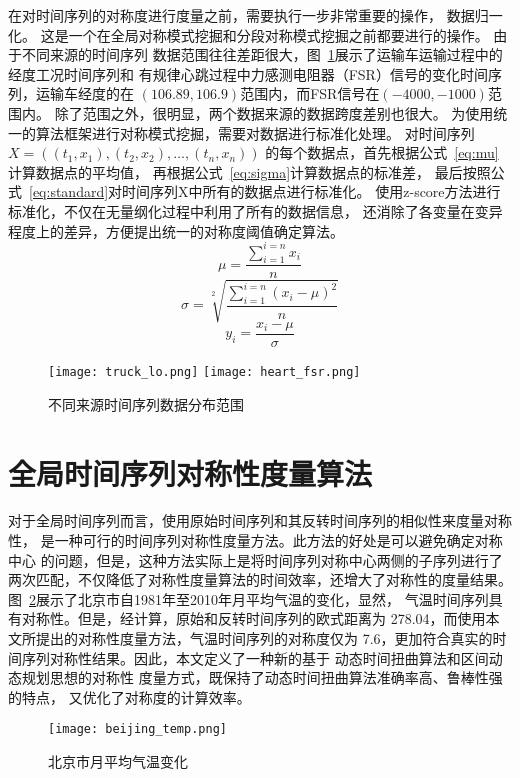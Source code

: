 在对时间序列的对称度进行度量之前，需要执行一步非常重要的操作，
数据归一化\cite{DBLP:journals/tec/HeITWNS21}。
这是一个在全局对称模式挖掘和分段对称模式挖掘之前都要进行的操作。
由于不同来源的时间序列
数据范围往往差距很大，图~\ref{fig:data_range}展示了运输车运输过程中的经度工况时间序列和
有规律心跳过程中力感测电阻器（FSR）信号的变化时间序列，运输车经度的在
$(106.89,106.9)$范围内，而FSR信号在$(-4000,-1000)$范围内。
除了范围之外，很明显，两个数据来源的数据跨度差别也很大。
为使用统一的算法框架进行对称模式挖掘，需要对数据进行标准化处理。
对时间序列$X=\left(\left(t_{1}, x_{1}\right),\left(t_{2}, x_{2}\right), \ldots,\left(t_{n}, x_{n}\right)\right)$
的每个数据点，首先根据公式~\ref{eq:mu}计算数据点的平均值，
再根据公式~\ref{eq:sigma}计算数据点的标准差，
最后按照公式~\ref{eq:standard}对时间序列X中所有的数据点进行标准化。
使用z-score方法进行标准化，不仅在无量纲化过程中利用了所有的数据信息，
还消除了各变量在变异程度上的差异，方便提出统一的对称度阈值确定算法。
\begin{equation}
  \mu=\frac{\sum_{i=1}^{i=n} x_{i}}{n}
  \label{eq:mu}
\end{equation}
\begin{equation}
  \sigma=\sqrt[2]{\frac{\sum_{i=1}^{i=n}\left(x_{i}-\mu\right)^{2}}{n}}
  \label{eq:sigma}
\end{equation}
\begin{equation}
  y_{i}=\frac{x_{i}-\mu}{\sigma}
  \label{eq:standard}
\end{equation}
\begin{figure}
  \centering
  {\texttt{[image: truck\_lo.png]}}
  {\texttt{[image: heart\_fsr.png]}}
  \caption{不同来源时间序列数据分布范围}
  \label{fig:data_range}
\end{figure}

\section{全局时间序列对称性度量算法}

对于全局时间序列而言，使用原始时间序列和其反转时间序列的相似性来度量对称性，
是一种可行的时间序列对称性度量方法。此方法的好处是可以避免确定对称中心
的问题，但是，这种方法实际上是将时间序列对称中心两侧的子序列进行了
两次匹配，不仅降低了对称性度量算法的时间效率，还增大了对称性的度量结果。
图~\ref{fig:beijing_temp}展示了北京市自1981年至2010年月平均气温的变化，显然，
气温时间序列具有对称性。但是，经计算，原始和反转时间序列的欧式距离为
278.04，而使用本文所提出的对称性度量方法，气温时间序列的对称度仅为
7.6，更加符合真实的时间序列对称性结果。因此，本文定义了一种新的基于
动态时间扭曲算法和区间动态规划思想的对称性
度量方式，既保持了动态时间扭曲算法准确率高、鲁棒性强的特点，
又优化了对称度的计算效率。
\begin{figure}
  \centering
  \texttt{[image: beijing\_temp.png]}
  \caption{北京市月平均气温变化}
  \label{fig:beijing_temp}
\end{figure}

